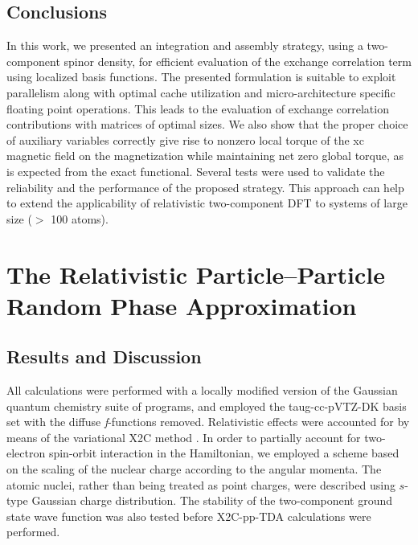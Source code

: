 \subsection{Conclusions}
In this work, we presented an integration and assembly strategy, 
using a two-component spinor density, for efficient evaluation
of the exchange correlation term using localized basis
functions. 
The presented formulation is suitable to exploit parallelism 
along with optimal cache utilization and micro-architecture specific floating point operations.
This leads to the evaluation of exchange correlation
contributions with matrices of optimal sizes. 
We also show that the proper choice of auxiliary variables 
correctly give rise to nonzero local torque of the xc magnetic field on the magnetization
while maintaining net zero global torque, as is expected from
the exact functional. 
Several tests were used to validate 
the reliability and the performance of the proposed strategy.
This approach can help to extend 
the applicability of relativistic two-component DFT 
to systems of large size ($>$ 100 atoms). 







\section{The Relativistic Particle--Particle Random Phase Approximation}



\subsection{Results and Discussion}
\label{sec:Results}

All calculations were performed with a locally modified version of the Gaussian quantum chemistry suite of programs,\cite{GDVI06}
and employed the taug-cc-pVTZ-DK basis set\cite{Dixon01_48} with the diffuse \emph{f}-functions removed.
Relativistic effects were accounted for by means of the variational X2C method .\cite{Reiher13_184105,Saue11_3077,Liu09_219,Liu10_532,Liu09_1945}
In order to partially account for two-electron spin-orbit interaction in the Hamiltonian, we employed a scheme based on the scaling of the nuclear charge according to the angular momenta.\cite{Boettger00_7809}
The atomic nuclei, rather than being treated as point charges, were described using $s$-type Gaussian charge distribution.\cite{Dyall97_207,Saue98_920}
The stability of the two-component ground state wave function was also tested before X2C-pp-TDA calculations were performed.\cite{Li15_154109}

